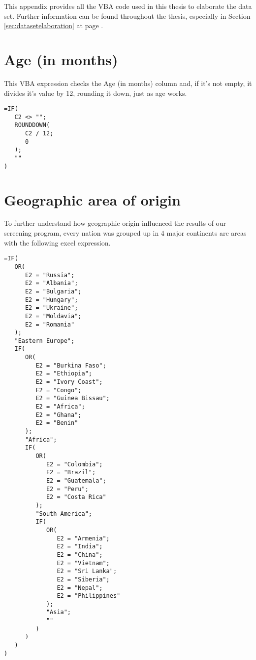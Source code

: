 \label{chap:codeused}
This appendix provides all the VBA code used in this thesis to elaborate the data set. Further information can be found throughout the thesis, especially in Section \ref{sec:datasetelaboration} at page \pageref{sec:datasetelaboration}.

\section{Age (in months)}\label{sec:ageinmonths}
This VBA expression checks the Age (in months) column and, if it's not empty, it divides it's value by 12, rounding it down, just as age works.

\begin{minipage}{\linewidth}
\begin{lstlisting}
=IF(
   C2 <> "";
   ROUNDDOWN(
      C2 / 12;
      0
   );
   ""
)
\end{lstlisting}
\end{minipage}

\section{Geographic area of origin}\label{sec:geographicarea}
To further understand how geographic origin influenced the results of our screening program, every nation was grouped up in 4 major continents are areas with the following excel expression.

\begin{minipage}{\linewidth}
\begin{lstlisting}
=IF(
   OR(
      E2 = "Russia";
      E2 = "Albania";
      E2 = "Bulgaria";
      E2 = "Hungary";
      E2 = "Ukraine";
      E2 = "Moldavia";
      E2 = "Romania"
   );
   "Eastern Europe";
   IF(
      OR(
         E2 = "Burkina Faso";
         E2 = "Ethiopia";
         E2 = "Ivory Coast";
         E2 = "Congo";
         E2 = "Guinea Bissau";
         E2 = "Africa";
         E2 = "Ghana";
         E2 = "Benin"
      );
      "Africa";
      IF(
         OR(
            E2 = "Colombia";
            E2 = "Brazil";
            E2 = "Guatemala";
            E2 = "Peru";
            E2 = "Costa Rica"
         );
         "South America";
         IF(
            OR(
               E2 = "Armenia";
               E2 = "India";
               E2 = "China";
               E2 = "Vietnam";
               E2 = "Sri Lanka";
               E2 = "Siberia";
               E2 = "Nepal";
               E2 = "Philippines"
            );
            "Asia";
            ""
         )
      )
   )
)
\end{lstlisting}
\end{minipage}

